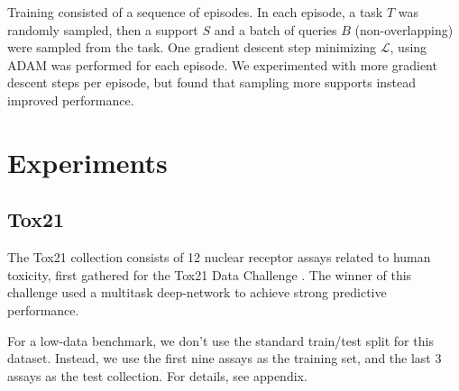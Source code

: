 \documentclass[journal=jacsat,manuscript=article]{achemso}
\begin{document}
 Training consisted of a sequence of episodes. In each episode, a task $T$ was randomly sampled, then a support $S$ and a batch of queries $B$ (non-overlapping) were sampled from the task. One gradient descent step minimizing $\mathcal{L}$, using ADAM \cite{kingma2014adam} was performed for each episode. We experimented with more gradient descent steps per episode, but found that sampling more supports instead improved performance.
\section{Experiments}
\subsection{Tox21}
The Tox21 collection consists of 12 nuclear receptor assays related to human toxicity, first gathered for the Tox21 Data Challenge \cite{tox21}. The winner of this challenge used a multitask deep-network \cite{unterthiner2015toxicity} to achieve strong predictive performance.

For a low-data benchmark, we don't use the standard train/test split for this dataset. Instead, we use the first nine assays as the training set, and the last 3 assays as the test collection. For details, see appendix.
\end{document}
